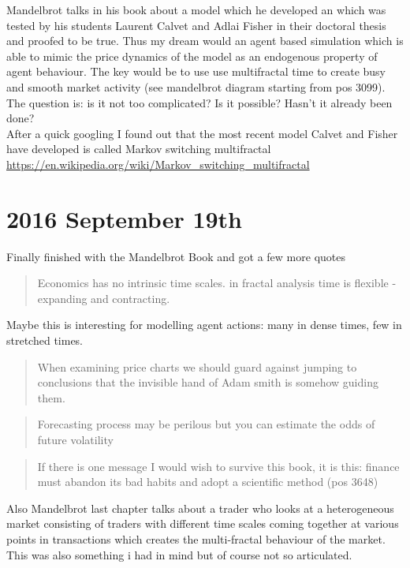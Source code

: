 Mandelbrot talks in his book about a model which he developed an which was tested by his students Laurent Calvet and Adlai Fisher in their doctoral thesis and proofed to be true. Thus my dream would an agent based simulation which is able to mimic the price dynamics of the model as an endogenous property of agent behaviour. The key would be to use use multifractal time to create busy and smooth market activity (see mandelbrot diagram starting from pos 3099).
\\ The question is: is it not too complicated? Is it possible? Hasn't it already been done? \\
After a quick googling I found out that the most recent model Calvet and Fisher have developed is called Markov switching multifractal \url{https://en.wikipedia.org/wiki/Markov_switching_multifractal} 

\section*{2016 September 19th}

Finally finished with the Mandelbrot Book and got a few more quotes

\begin{quote}
Economics has no intrinsic time scales. in fractal analysis time is flexible - expanding and contracting.
\end{quote}

Maybe this is interesting for modelling agent actions: many in dense times, few in stretched times.

\begin{quote}
When examining price charts we should guard against jumping to conclusions that the invisible hand of Adam smith is somehow guiding them.
\end{quote}

\begin{quote}
Forecasting process may be perilous but you can estimate the odds of future volatility
\end{quote}

\begin{quote}
If there is one message I would wish to survive this book, it is this: finance must abandon its bad habits and adopt a scientific method (pos 3648)
\end{quote}

Also Mandelbrot last chapter talks about a trader who looks at a heterogeneous market consisting of traders with different time scales coming together at various points in transactions which creates the multi-fractal behaviour of the market. This was also something i had in mind but of course not so articulated.

